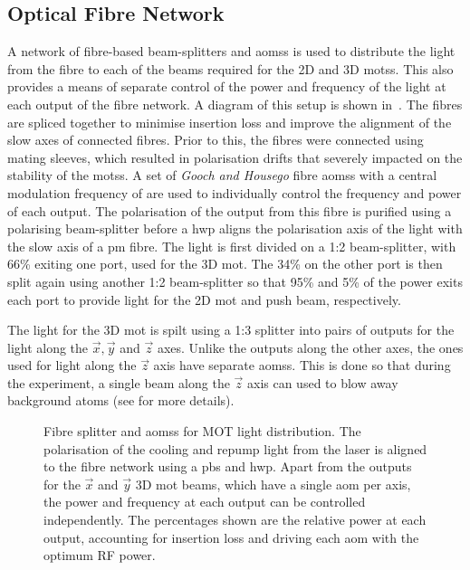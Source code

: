 \subsection{Optical Fibre Network}
A network of fibre-based beam-splitters and \acp{aoms} is used to distribute the
light from the \Muquans fibre to each of the beams required for the 2D and 3D
\acp{mots}. This also provides a means of separate control of the power and
frequency of the light at each output of the fibre network. A diagram of this
setup is shown in~. The fibres are spliced together
to minimise insertion loss and improve the alignment of the slow axes of
connected fibres. Prior to this, the fibres were connected using mating sleeves,
which resulted in polarisation drifts that severely impacted on the stability of
the \acp{mots}. A set of \textit{Gooch and Housego} fibre \acp{aoms} with a
central modulation frequency of  are used to
individually control the frequency and power of each output. The polarisation of
the output from this fibre is purified using a polarising beam-splitter before a
\ac{hwp} aligns the polarisation axis of the light with the slow axis of a
\ac{pm} fibre. The light is first divided on a 1:2 beam-splitter, with 66\%
exiting one port, used for the 3D \ac{mot}. The 34\% on the other port is then
split again using another 1:2 beam-splitter so that 95\% and 5\% of the power
exits each port to provide light for the 2D \ac{mot} and push beam,
respectively. \par\noindent The light for the 3D \ac{mot} is spilt using a 1:3
splitter into pairs of outputs for the light along the \(\vec{x},\vec{y}\) and
\(\vec{z}\) axes. Unlike the outputs along the other axes, the ones used for
light along the \(\vec{z}\) axis have separate \acp{aoms}. This is done so that
during the experiment, a single beam along the \(\vec{z}\) axis can used to blow
away background atoms (see  for more details).

\begin{figure}
	\centering
	\def\svgwidth{0.65\textwidth}
	\small{}
	\caption[Network of optical fibre splitters and \acp{aoms} for \ac{MOT}light distribution]{Fibre splitter and \acp{aoms} for \ac{MOT} light distribution. The polarisation of the cooling and repump light from the \Muquans laser is aligned to the fibre network using a \ac{pbs} and \ac{hwp}. Apart from the outputs for the \(\vec{x}\) and \(\vec{y}\) 3D \ac{mot} beams, which have a single \ac{aom} per axis, the power and frequency at each output can be controlled independently. The percentages shown are the relative power at each output, accounting for insertion loss and driving each \ac{aom} with the optimum RF power.}
	\label{fig:fibre_network}
\end{figure}
